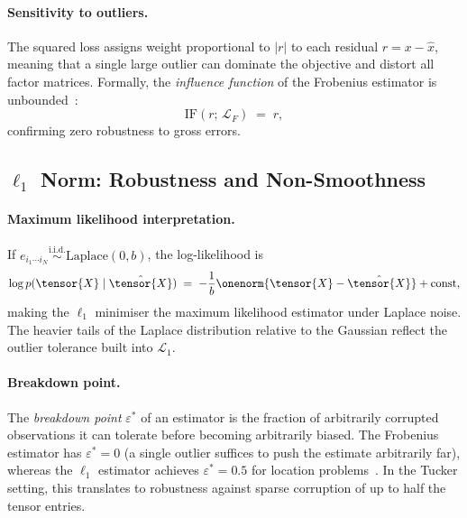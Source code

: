 \paragraph{Sensitivity to outliers.}
The squared loss assigns weight proportional to $|r|$ to each residual
$r = x - \hat{x}$, meaning that a single large outlier can dominate the
objective and distort all factor matrices.
Formally, the \emph{influence function} of the Frobenius estimator is
unbounded~\cite{hampel1986robust}:
\begin{equation}
  \mathrm{IF}(r;\, \mathcal{L}_F) \;=\; r,
  \label{eq:if_frob}
\end{equation}
confirming zero robustness to gross errors.

\subsection{\texorpdfstring{$\ell_1$}{L1} Norm: Robustness and
            Non-Smoothness}
\label{subsec:l1_analysis}

\paragraph{Maximum likelihood interpretation.}
If $e_{i_1\cdots i_N} \overset{\text{i.i.d.}}{\sim}
\mathrm{Laplace}(0, b)$, the log-likelihood is
\begin{equation}
  \log p(\tensor{X} \mid \hat{\tensor{X}})
  \;=\; -\frac{1}{b}\onenorm{\tensor{X} - \hat{\tensor{X}}}
        + \text{const},
  \label{eq:laplace_ll}
\end{equation}
making the $\ell_1$ minimiser the maximum likelihood estimator under
Laplace noise.
The heavier tails of the Laplace distribution relative to the Gaussian
reflect the outlier tolerance built into $\mathcal{L}_1$.

\paragraph{Breakdown point.}
The \emph{breakdown point} $\varepsilon^*$ of an estimator is the fraction
of arbitrarily corrupted observations it can tolerate before becoming
arbitrarily biased.
The Frobenius estimator has $\varepsilon^* = 0$ (a single outlier suffices
to push the estimate arbitrarily far), whereas the $\ell_1$ estimator
achieves $\varepsilon^* = 0.5$ for location problems~\cite{maronna2019robust}.
In the Tucker setting, this translates to robustness against sparse
corruption of up to half the tensor entries.

